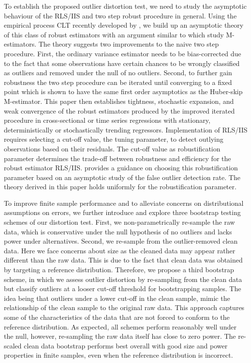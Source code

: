 \documentclass[11pt, letterpaper]{article}
\numberwithin{algorithm}{section}
\numberwithin{assumption}{section}
\numberwithin{lemma}{section}
\numberwithin{theorem}{section}
\numberwithin{corollary}{section}
\numberwithin{remark}{section}
\numberwithin{equation}{section}
\numberwithin{figure}{section}
\numberwithin{table}{section}
\begin{document}
To establish the proposed outlier distortion test, we need to study the asymptotic behaviour of the RLS/IIS and two step robust procedure in general. Using the empirical process CLT recently developed by \cite{berenguer2019analysis}, we build up an asymptotic theory of this class of robust estimators with an argument similar to \cite{johansen2009analysis, johansen2013outlier, johansen2019boundedness} which study M-estimators. The theory suggests two improvements to the naive two step procedure. First, the ordinary variance estimator needs to be bias-corrected due to the fact that some observations have certain chances to be wrongly classified as outliers and removed under the null of no outliers. Second, to further gain robustness the two step procedure can be iterated until converging to a fixed point which is shown to have the same first order asymptotics as the Huber-skip M-estimator. This paper then establishes tightness, stochastic expansion, and weak convergence of the robust estimators produced by the improved iterated procedure in cross-sectional or time series regressions with stationary, deterministically or stochastically trending regressors. Implementation of RLS/IIS requires selecting a cut-off value, the tuning parameter, to detect outlying observations based on their residuals. The cut-off value as robustification parameter determines the trade-off between robustness and efficiency for the robust estimator RLS/IIS. \cite{jiao2020testingoutlier} provides a guidance on choosing this robustification parameter based on an asymptotic study of the false outlier detection rate. The theory derived in this paper holds uniformly for the robustification parameter.

To improve finite sample performance and to alleviate concerns on distributional assumptions on errors, we further introduce and explore three bootstrap testing schemes of our distortion test. First, we non-parametrically re-sample the raw data, which is conservative under the null hypothesis of no outliers and lacks power under alternatives. Second, we re-sample from the outlier-removed clean data. Here we face concerns about size as the cleaned data may appear rather different than the raw data. This is due to the fact that clean data was obtained by targeting a reference distribution. Therefore, we propose a third bootstrap scheme, in which we assess outlier distortion by re-sampling from the clean data but classify outliers at a looser cut-off threshold for bootstrapping samples. The idea being that outliers under a lower cut-off in the clean sample, mimic the relationship of the clean sample to the original raw data. This approach captures some of the characteristics of the data that are not forced to conform to the reference distribution. As expected, all schemes perform reasonably well under the null, however, re-sampling the raw data itself has close to zero power. The re-scaled clean data bootstrap performs best overall with good size and power properties in finite samples, even when the reference distribution is incorrect.
\end{document}
